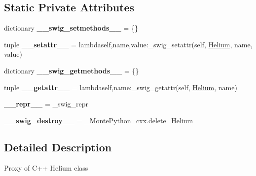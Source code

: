 \subsection*{Static Private Attributes}
\begin{DoxyCompactItemize}
\item 
\hypertarget{classMontePython__cxx_1_1Helium_afb278ddd1dce33665736eced8590f138}{}dictionary {\bfseries \+\_\+\+\_\+swig\+\_\+setmethods\+\_\+\+\_\+} = \{\}\label{classMontePython__cxx_1_1Helium_afb278ddd1dce33665736eced8590f138}

\item 
\hypertarget{classMontePython__cxx_1_1Helium_ae13a338690d05160edd6f9d95c4b1e2b}{}tuple {\bfseries \+\_\+\+\_\+setattr\+\_\+\+\_\+} = lambdaself,name,value\+:\+\_\+swig\+\_\+setattr(self, \hyperlink{classMontePython__cxx_1_1Helium}{Helium}, name, value)\label{classMontePython__cxx_1_1Helium_ae13a338690d05160edd6f9d95c4b1e2b}

\item 
\hypertarget{classMontePython__cxx_1_1Helium_a40be2408a68b3d011eb950711631edcc}{}dictionary {\bfseries \+\_\+\+\_\+swig\+\_\+getmethods\+\_\+\+\_\+} = \{\}\label{classMontePython__cxx_1_1Helium_a40be2408a68b3d011eb950711631edcc}

\item 
\hypertarget{classMontePython__cxx_1_1Helium_ae3eb7437e193aaccd339e4dfb33fffc9}{}tuple {\bfseries \+\_\+\+\_\+getattr\+\_\+\+\_\+} = lambdaself,name\+:\+\_\+swig\+\_\+getattr(self, \hyperlink{classMontePython__cxx_1_1Helium}{Helium}, name)\label{classMontePython__cxx_1_1Helium_ae3eb7437e193aaccd339e4dfb33fffc9}

\item 
\hypertarget{classMontePython__cxx_1_1Helium_aa22251123c99ef6818adabcf96876111}{}{\bfseries \+\_\+\+\_\+repr\+\_\+\+\_\+} = \+\_\+swig\+\_\+repr\label{classMontePython__cxx_1_1Helium_aa22251123c99ef6818adabcf96876111}

\item 
\hypertarget{classMontePython__cxx_1_1Helium_a7a784f5221071761827dec2b910e0163}{}{\bfseries \+\_\+\+\_\+swig\+\_\+destroy\+\_\+\+\_\+} = \+\_\+\+Monte\+Python\+\_\+cxx.\+delete\+\_\+\+Helium\label{classMontePython__cxx_1_1Helium_a7a784f5221071761827dec2b910e0163}

\end{DoxyCompactItemize}


\subsection{Detailed Description}
\begin{DoxyVerb}Proxy of C++ Helium class\end{DoxyVerb}
 

